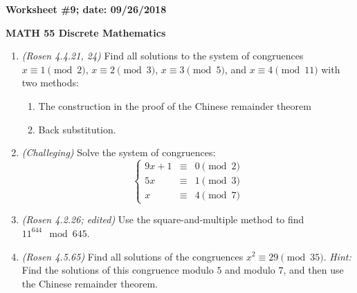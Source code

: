 \documentclass{article}
\begin{document}
{\bf Worksheet \#9; date: 09/26/2018}

{\bf MATH 55 Discrete Mathematics}

\begin{enumerate}
\item {\em (Rosen 4.4.21, 24)} Find all solutions to the system of congruences $x \equiv 1 \pmod{2}$, $x \equiv 2 \pmod{3}$, $x \equiv 3 \pmod{5}$, and $x \equiv 4 \pmod{11}$ with two methods:
\begin{enumerate}
\item The construction in the proof of the Chinese remainder theorem
\item Back substitution.
\end{enumerate}

\item {\em (Challeging)} Solve the system of congruences:
\[
\left\{
\begin{array}{rcl}
9x + 1 &\equiv& 0 \pmod{2} \\
5x &\equiv& 1 \pmod{3} \\
x &\equiv& 4 \pmod{7}
\end{array}
\right.
\]

\item {\em (Rosen 4.2.26; edited)} Use the square-and-multiple method to find $11^{644} \mod 645$.

\item {\em (Rosen 4.5.65)} Find all solutions of the congruences $x^2 \equiv 29 \pmod{35}$. {\em Hint:} Find the solutions of this congruence modulo $5$ and modulo $7$, and then use the Chinese remainder theorem.
\end{enumerate}
\end{document}
